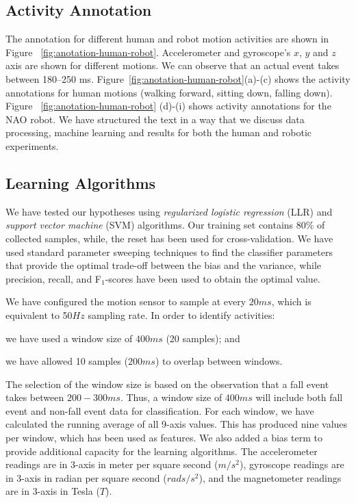 \documentclass[letterpaper]{article}
\begin{document}
\begin{sloppy}
\subsection{Activity Annotation}

The annotation for different human and robot motion activities are shown in 
Figure {~\ref{fig:anotation-human-robot}}. 
Accelerometer and gyroscope's $x$, $y$ and $z$ axis are shown for different motions. We can observe 
that an 
actual event takes between 180--250 ms. Figure{~\ref{fig:anotation-human-robot}}(a)-(c) shows the activity 
annotations for human motions (walking forward, sitting down, falling down). 
Figure {~\ref{fig:anotation-human-robot}}
(d)-(i) shows activity annotations for the NAO robot. We have structured the text in a way that we discuss 
data processing, machine learning and results for both the human and robotic experiments.

\subsection{Learning Algorithms}

We have tested our hypotheses using  {\em regularized logistic regression} (LLR) and {\em support 
vector machine} (SVM) algorithms. Our training set contains 80\% of collected samples, while, the 
reset has been used for cross-validation. We have used standard parameter sweeping techniques to 
find the classifier parameters that provide the optimal trade-off between the bias and the 
variance, while precision, recall, and F$_1$-scores have been used to obtain the optimal value. 

We  have configured the motion sensor to sample at every  $20ms$, which is equivalent to 50$Hz$ 
sampling rate. In order to 
identify activities: \begin{inparaenum}[1)] \item we have used a window size of $400ms$ (20 
samples); and \item we have allowed 10 samples ($200ms$) to overlap between windows. 
\end{inparaenum} The selection of the window size is based on the observation that a fall event 
takes between $200-300ms$. Thus, a window size of $400ms$ will include both fall event and 
non-fall event data for classification. For each window, we have calculated the running average of 
all 9-axis values. This has produced nine values per window, which has been used as features. We 
also added a bias term to provide additional capacity for the learning algorithms. The  
accelerometer readings are in 3-axis in meter per square second ($m/s^2$), gyroscope readings are 
in 3-axis in radian per square second ($rads/s^2$), and the magnetometer readings are in 3-axis in 
Tesla ($T$). 


\end{sloppy}
\end{document}
